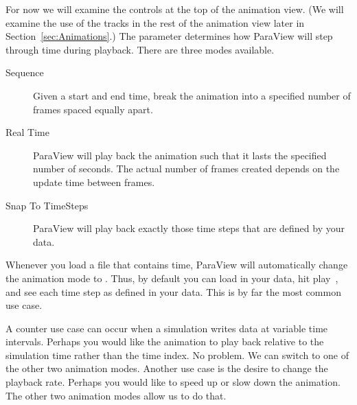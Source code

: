 For now we will examine the controls at the top of the animation view. (We
will examine the use of the tracks in the rest of the animation view later
in Section~\ref{sec:Animations}.) The  parameter
determines how ParaView will step through time during playback.  There are
three modes available.

\begin{description}
\item[Sequence]  Given a start and end
  time, break the animation into a specified number of frames spaced
  equally apart.
\item[Real Time]  ParaView will play back
  the animation such that it lasts the specified number of seconds.  The
  actual number of frames created depends on the update time between
  frames.
\item[Snap To TimeSteps] 
  ParaView will play back exactly those time steps that are defined by your
  data.
\end{description}

Whenever you load a file that contains time, ParaView will automatically
change the animation mode to .  Thus, by default you
can load in your data, hit play~\vcrPlay, and see each time step as defined
in your data.  This is by far the most common use case.

A counter use case can occur when a simulation writes data at variable time
intervals.  Perhaps you would like the animation to play back relative to
the simulation time rather than the time index.  No problem.  We can switch
to one of the other two animation modes.  Another use case is the desire to
change the playback rate.  Perhaps you would like to speed up or slow down
the animation.  The other two animation modes allow us to do that.

